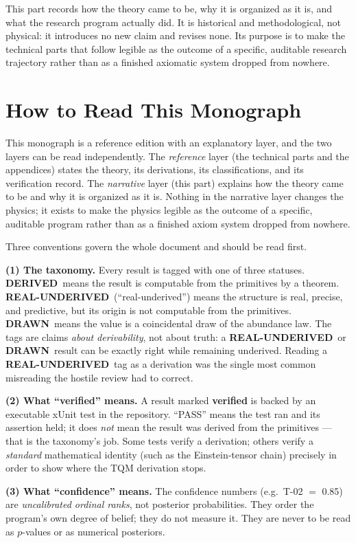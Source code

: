 \documentclass[10pt,twoside,openany]{book}
\newcommand{\derived}{\textbf{DERIVED}}
\newcommand{\realunder}{\textbf{REAL-UNDERIVED}}
\newcommand{\drawn}{\textbf{DRAWN}}
\begin{document}
This part records how the theory came to be, why it is organized as it is, and what the
research program actually did. It is historical and methodological, not physical: it
introduces no new claim and revises none. Its purpose is to make the technical parts that
follow legible as the outcome of a specific, auditable research trajectory rather than as
a finished axiomatic system dropped from nowhere.

\chapter{How to Read This Monograph}
\label{ch:reading}

This monograph is a reference edition with an explanatory layer, and the two layers can be
read independently. The \emph{reference} layer (the technical parts and the appendices)
states the theory, its derivations, its classifications, and its verification record. The
\emph{narrative} layer (this part) explains how the theory came to be and why it is
organized as it is. Nothing in the narrative layer changes the physics; it exists to make
the physics legible as the outcome of a specific, auditable program rather than as a
finished axiom system dropped from nowhere.

Three conventions govern the whole document and should be read first.

\textbf{(1) The taxonomy.} Every result is tagged with one of three statuses.
\derived\ means the result is computable from the primitives by a theorem.
\realunder\ (``real-underived'') means the structure is real, precise, and predictive, but
its origin is not computable from the primitives. \drawn\ means the value is a
coincidental draw of the abundance law. The tags are claims \emph{about derivability}, not
about truth: a \realunder\ or \drawn\ result can be exactly right while remaining
underived. Reading a \realunder\ tag as a derivation was the single most common misreading
the hostile review had to correct.

\textbf{(2) What ``verified'' means.} A result marked \textbf{verified} is backed by an
executable xUnit test in the repository. ``PASS'' means the test ran and its assertion
held; it does \emph{not} mean the result was derived from the primitives --- that is the
taxonomy's job. Some tests verify a derivation; others verify a \emph{standard}
mathematical identity (such as the Einstein-tensor chain) precisely in order to show where
the TQM derivation stops.

\textbf{(3) What ``confidence'' means.} The confidence numbers (e.g.\ T-02 $=$ 0.85) are
\emph{uncalibrated ordinal ranks}, not posterior probabilities. They order the program's
own degree of belief; they do not measure it. They are never to be read as $p$-values or
as numerical posteriors.
\end{document}
